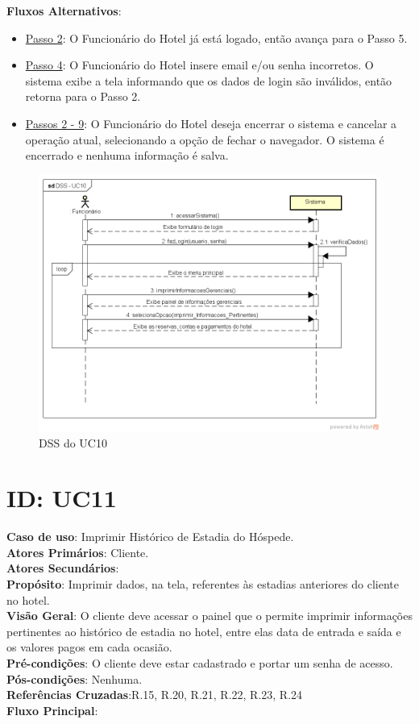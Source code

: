 \documentclass[notitlepage]{article}
\begin{document}
\textbf{Fluxos Alternativos}:\\
\begin{itemize}
\item \underline{Passo 2}: O Funcionário do Hotel já está logado, então avança para o Passo 5.
\item \underline{Passo 4}: O Funcionário do Hotel insere email e/ou senha incorretos. O sistema exibe a tela informando que os dados de login são inválidos, então retorna para o Passo 2.
\item \underline{Passos 2 - 9}: O Funcionário do Hotel deseja encerrar o sistema e cancelar a operação atual, selecionando a opção de fechar o navegador. O sistema é encerrado e nenhuma informação é salva.  
\end{itemize}
\begin{figure}[!htbp]
	\centering
  \includegraphics[scale=0.65]{UC10.png}
  \caption{DSS do UC10}
  \label{fig:UC10}
\end{figure}

\clearpage

\section{ID: UC11}
\noindent\textbf{Caso de uso}: Imprimir Histórico de Estadia do Hóspede.\\
\textbf{Atores Primários}: Cliente. \\
\textbf{Atores Secundários}: \\
\textbf{Propósito}: Imprimir dados, na tela, referentes às estadias anteriores do cliente no hotel.\\
\textbf{Visão Geral}: O cliente deve acessar o painel que o permite imprimir informações pertinentes ao histórico de estadia no hotel, entre elas data de entrada e saída e os valores pagos em cada ocasião.\\
\textbf{Pré-condições}: O cliente deve estar cadastrado e portar um senha de acesso.\\
\textbf{Pós-condições}: Nenhuma.\\
\textbf{Referências Cruzadas}:R.15, R.20, R.21, R.22, R.23, R.24\\
\newline
\textbf{Fluxo Principal}:\\
\end{document}
